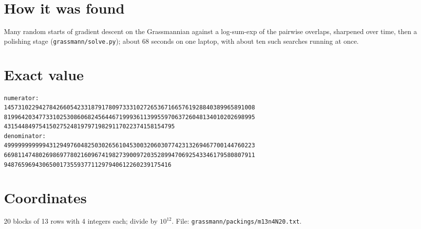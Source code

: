 \documentclass[11pt,a4paper]{article}
\begin{document}
\section{How it was found}
Many random starts of gradient descent on the Grassmannian against a log-sum-exp of the pairwise overlaps, sharpened over time, then a polishing stage (\texttt{grassmann/solve.py}); about 68 seconds on one laptop, with about ten such searches running at once.


\appendix
\section{Exact value}
{\small
\begin{verbatim}
numerator:
145731022942784266054233187917809733310272653671665761928840389965891008
819964203477331025308606824564467199936113995597063726048134010202698995
4315448497541502752481979719829117022374158154795
denominator:
499999999999431294976048250302656104530032060307742313269467700144760223
669811474802698697780216096741982739009720352899470692543346179580807911
948765969430650017355937711297940612260239175416
\end{verbatim}}

\section{Coordinates}
20 blocks of 13 rows with 4 integers each; divide by $10^{12}$. File: \texttt{grassmann/packings/m13n4N20.txt}.
{\tiny
\begin{multicols}{3}
\end{multicols}}
\end{document}
